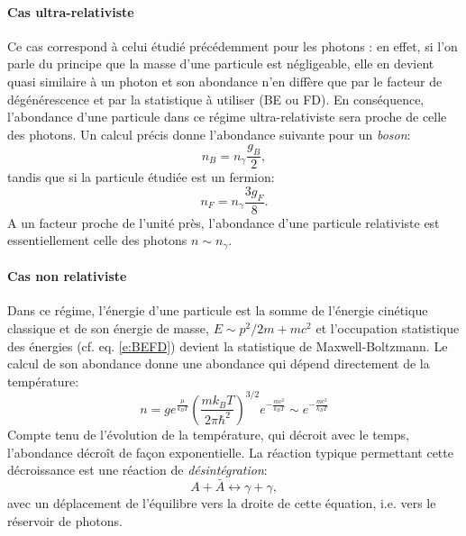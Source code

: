  \paragraph{Cas ultra-relativiste}
Ce cas correspond à celui étudié précédemment pour les photons : en effet, si l'on parle du principe que la masse d'une particule est négligeable, elle en devient quasi similaire à un photon et son abondance n'en diffère que par le facteur de dégénérescence et par la statistique à utiliser (BE ou FD). En conséquence, l'abondance d'une particule dans ce régime ultra-relativiste sera proche de celle des photons. Un calcul précis donne l'abondance suivante pour un \textit{boson}:
\begin{equation}
n_B=n_\gamma\frac{g_B}{2},
\end{equation}
tandis que si la particule étudiée est un fermion:
\begin{equation}
n_F=n_\gamma\frac{3g_F}{8}.
\end{equation}
A un facteur proche de l'unité près, l'abondance d'une particule relativiste est essentiellement celle des photons $n\sim n_\gamma$.

\paragraph{Cas non relativiste}
Dans ce régime, l'énergie d'une particule est la somme de l'énergie cinétique classique et de son énergie de masse, $E\sim p^2/2m +mc^2$ et l'occupation statistique des énergies (cf. eq. \ref{e:BEFD}) devient la statistique de  Maxwell-Boltzmann. Le calcul de son abondance donne une abondance qui dépend directement de la température:
\begin{equation}
n=ge^{\frac{\mu}{k_BT}}\left(\frac{m k_B T}{2\pi\hbar^2}\right)^{3/2}e^{-\frac{mc^2}{k_B T}}\sim e^{-\frac{mc^2}{k_B T}}
\label{e:nonrel}
\end{equation}
Compte tenu de l'évolution de la température, qui décroit avec le temps, l'abondance décroît de façon exponentielle. La réaction typique permettant cette décroissance est une réaction de \textit{désintégration}:
\begin{equation}
A+\bar A \leftrightarrow \gamma+\gamma,
\end{equation}
avec un déplacement de l'équilibre vers la droite de cette équation, i.e. vers le réservoir de photons.

